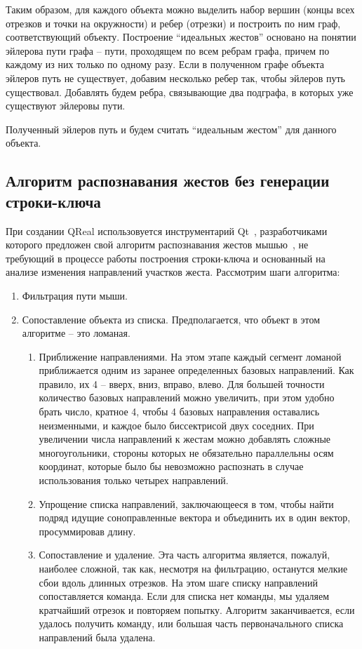 \documentclass[a5paper]{article}
\begin{document}
Таким образом, для каждого объекта можно выделить набор вершин (концы всех отрезков и точки на окружности) и ребер (отрезки) и 
построить по ним граф, соответствующий объекту. Построение ``идеальных жестов'' основано на понятии эйлерова пути графа --  
пути, проходящем по всем ребрам графа, причем по каждому из них только по одному разу. 
Если в полученном графе объекта эйлеров путь не существует, добавим несколько ребер так, чтобы эйлеров путь существовал. 
Добавлять будем ребра, связывающие два подграфа, в которых уже существуют эйлеровы пути.

Полученный эйлеров путь и будем считать ``идеальным жестом'' для данного объекта. 


\subsection{Алгоритм распознавания жестов без генерации строки-ключа}

При создании QReal использовуется инструментарий Qt~\cite{qt}, разработчиками которого предложен свой алгоритм распознавания жестов мышью~\cite{qtGestures},
не требующий в процессе работы построения строки-ключа и основанный на анализе изменения направлений участков жеста. Рассмотрим шаги алгоритма:
\begin{enumerate}
  \item Фильтрация пути мыши.
  \item Сопоставление объекта из списка. Предполагается, что объект в этом алгоритме -- это ломаная.
  \begin{enumerate}
    \item Приближение направлениями. На этом этапе каждый сегмент ломаной приближается одним из заранее определенных базовых направлений. 
Как правило, их 4 – вверх, вниз, вправо, влево. Для большей точности количество базовых направлений можно увеличить, при этом удобно 
брать число, кратное 4, чтобы 4 базовых направления оставались неизменными, и каждое было биссектрисой двух соседних. При увеличении числа 
направлений к жестам можно добавлять сложные многоугольники, стороны которых не обязательно параллельны осям координат, которые было бы 
невозможно распознать в случае использования только четырех направлений.
    \item Упрощение списка направлений, заключающееся в том, чтобы найти подряд идущие соноправленные вектора и объединить их в 
один вектор, просуммировав длину.
    \item Сопоставление и удаление. Эта часть алгоритма является, пожалуй, наиболее сложной, так как, несмотря на фильтрацию, останутся 
мелкие сбои вдоль длинных отрезков. На этом шаге списку направлений сопоставляется команда. Если для списка нет команды, мы удаляем 
кратчайший отрезок и повторяем попытку. Алгоритм заканчивается, если удалось получить команду, или большая часть первоначального списка 
направлений была удалена.
  \end{enumerate}
\end{enumerate}
\end{document}
